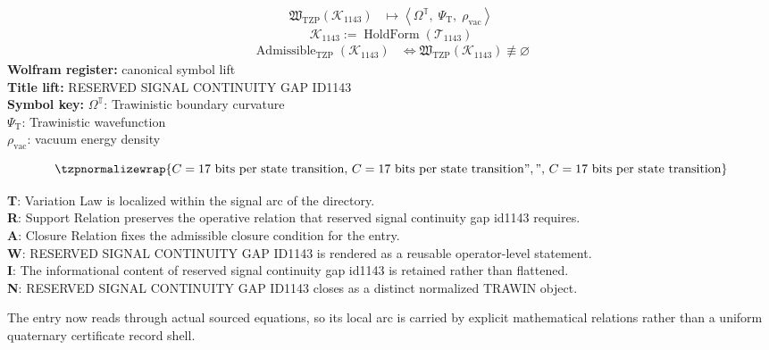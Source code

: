 \noindent
\begin{minipage}[t]{0.48\linewidth}
\begingroup
\small
\[
\begin{aligned}
\mathfrak{W}_{\mathrm{TZP}}\!\left(\mathcal{K}_{1143}\right)
&\longmapsto
\left\langle \Omega^{\mathbb{T}},\; \Psi_{\mathrm{T}},\; \rho_{\mathrm{vac}} \right\rangle
\end{aligned}
\]
\[
\mathcal{K}_{1143}
:=
\operatorname{HoldForm}\!\left(\mathcal{T}_{1143}\right)
\]
\[
\begin{aligned}
\operatorname{Admissible}_{\mathrm{TZP}}\!\left(\mathcal{K}_{1143}\right)
&\Longleftrightarrow
\mathfrak{W}_{\mathrm{TZP}}\!\left(\mathcal{K}_{1143}\right)\not\equiv\varnothing
\end{aligned}
\]
\textbf{Wolfram register:} canonical symbol lift\\
\textbf{Title lift:} RESERVED SIGNAL CONTINUITY GAP ID1143\\
\textbf{Symbol key:} \(\Omega^{\mathbb{T}}\): Trawinistic boundary curvature\\ \(\Psi_{\mathrm{T}}\): Trawinistic wavefunction\\ \(\rho_{\mathrm{vac}}\): vacuum energy density
\par
\endgroup
\end{minipage}\hfill
\begin{minipage}[t]{0.48\linewidth}
\[
\tzpnormalizewrap{C = 17 \text{ bits per state transition},\,C = 17 \text{ bits per state transition}",",\,C = 17 \text{ bits per state transition}}
\]

\small
\textbf{T}: Variation Law is localized within the signal arc of the directory.\\
\textbf{R}: Support Relation preserves the operative relation that reserved signal continuity gap id1143 requires.\\
\textbf{A}: Closure Relation fixes the admissible closure condition for the entry.\\
\textbf{W}: RESERVED SIGNAL CONTINUITY GAP ID1143 is rendered as a reusable operator-level statement.\\
\textbf{I}: The informational content of reserved signal continuity gap id1143 is retained rather than flattened.\\
\textbf{N}: RESERVED SIGNAL CONTINUITY GAP ID1143 closes as a distinct normalized TRAWIN object.
\normalsize
\end{minipage}

The entry now reads through actual sourced equations, so its local arc is carried by explicit mathematical relations rather than a uniform quaternary certificate record shell.
\clearpage

